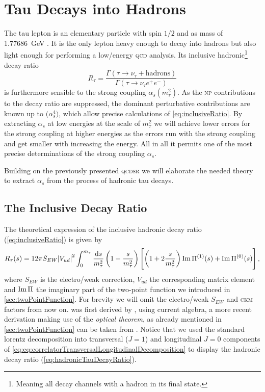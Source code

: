 \documentclass[../../index.tex]{subfiles}
\begin{document}
\chapter{Tau Decays into Hadrons}
The tau lepton is an elementary particle with spin \(1/2\) and as mass of
\SI{1.77686}{\giga\eV} \cite{PDG2018}. It is the only lepton heavy enough to
decay into hadrons but also light enough for performing a low\-/energy
\textsc{qcd} analysis.  Its inclusive hadronic\footnote{Meaning all decay channels
  with a hadron in its final state.} decay ratio
\begin{equation}
  \label{eq:inclusiveRatio}
  R_\tau = \frac{\Gamma(\tau \to \nu_\tau + \text{hadrons})}{\Gamma(\tau \to \nu_\tau e^+ e^-)}
\end{equation}
is furthermore sensible to the strong coupling
\(\alpha_s(m_\tau^2)\). As the \textsc{np} contributions to the decay ratio are
suppressed, the dominant perturbative contributions are known up to
\(\mathcal(\alpha_s^4)\), which allow precise calculations of \cref{eq:inclusiveRatio}. 
By extracting \(\alpha_s\) at low energies at the scale of \(m_\tau^2\) we will
achieve lower errors for the strong coupling at higher energies as the errors run
with the strong coupling and get smaller with increasing the energy. All in all
it permits one of the most precise determinations of the
strong coupling \(\alpha_s\).

Building on the previously presented \textsc{qcdsr} we will elaborate the needed
theory to extract \(\alpha_s\) from the process of hadronic tau decays.

\section{The Inclusive Decay Ratio}
The theoretical expression of the inclusive hadronic decay ratio
(\cref{eq:inclusiveRatio}) is given by
\begin{equation}
  \label{eq:hadronicTauDecayRatio}
  R_\tau(s) = 12 \pi S_{EW} \abs{V_{ud}}^2 \int_0^{m_\tau} \frac{\dif s}{m_\tau^2}
  \left( 1 - \frac{s}{m_\tau^2} \right)
  \left[ \left( 1 + 2 \frac{s}{m_\tau^2} \right) \Ima \Pi^{(1)}(s) + \Ima \Pi^{(0)}(s) \right],
\end{equation}
where \(S_{EW}\) is the electro\-/weak correction, \(V_{ud}\) the corresponding
 matrix element and $\operatorname{Im} \Pi$ the
imaginary part of the two-point function we introduced in
\cref{sec:twoPointFunction}. For brevity we will omit the electro\-/weak
\(S_{EW}\) and \textsc{ckm} factors from now on. 
was first derived by \cite{Tsai1971}, using current algebra, a more recent
derivation making use of the \textit{optical theorem}, as already mentioned in
\cref{sec:twoPointFunction} can be taken from \cite{Schwab2002}. Notice that we
used the standard lorentz decomposition into transversal (\(J=1\)) and
longitudinal \(J=0\) components of
\cref{eq:eq:correlatorTransversalLongitudinalDecomposition} to display the
hadronic decay ratio (\cref{eq:hadronicTauDecayRatio}).
\end{document}
